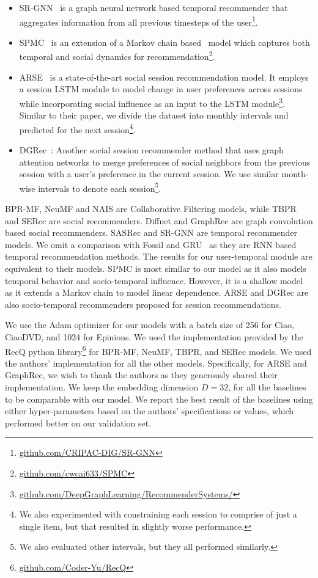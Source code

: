\begin{itemize}
\item SR-GNN~\cite{SRGNN} is a graph neural network based temporal recommender that aggregates information from all previous timesteps of the user\footnote{\url{github.com/CRIPAC-DIG/SR-GNN}}.

\item SPMC~\cite{Cai:2017} is an extension of a Markov chain based~\cite{Rendle2} model which captures both temporal and social dynamics for recommendation\footnote{\url{github.com/cwcai633/SPMC}}.


\item ARSE~\cite{Sun:2018} is a state-of-the-art social session recommendation model. It employs a session LSTM module to model change in user preferences across sessions while incorporating social influence as an input to the LSTM module\footnote{\url{github.com/DeepGraphLearning/RecommenderSystems/}}. Similar to their paper, we divide the dataset into monthly intervals and predicted for the next session\footnote{We also experimented with constraining each session to comprise of just a single item, but that resulted in slightly worse performance.}.
\item DGRec~\cite{Song:2019}: Another social session recommender method that uses graph attention networks to merge preferences of social neighbors from the previous session with a user's preference in the current session. We use similar month-wise intervals to denote each session\footnote{We also evaluated other intervals, but they all performed similarly.}.
\end{itemize}

BPR-MF, NeuMF and NAIS are Collaborative Filtering models, while TBPR and SERec are social recommenders.
Diffnet and GraphRec are graph convolution based social recommenders. SASRec and SR-GNN are temporal recommender models. We omit a comparison with Fossil and GRU~\cite{GRU4Rec} as they are RNN based temporal recommendation methods. The results for our user-temporal module are equivalent to their models.
SPMC is most similar to our model as it also models temporal behavior and socio-temporal influence. However, it is a shallow model as it extends a Markov chain to model linear dependence. ARSE and DGRec are also socio-temporal recommenders proposed for session recommendations.

We use the Adam optimizer for our models with a batch size of 256 for Ciao, CiaoDVD, and 1024 for Epinions. We used the implementation provided by the RecQ python library\footnote{\url{github.com/Coder-Yu/RecQ}} for BPR-MF, NeuMF, TBPR, and SERec models. We used the authors' implementation for all the other models. Specifically, for ARSE and GraphRec, we wish to thank the authors as they generously shared their implementation.
We keep the embedding dimension $D=32$, for all the baselines to be comparable with our model. We report the best result of the baselines using either hyper-parameters based on the authors' specifications or values, which performed better on our validation set.

